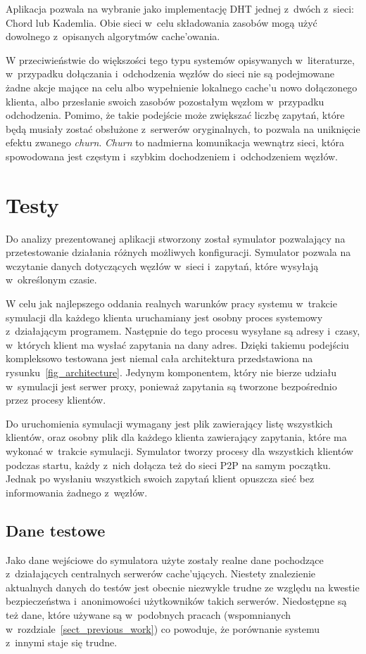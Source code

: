 \documentclass[a4paper,11pt]{scrartcl}
\newcommand{\s}{ }
\newcommand{\keszu}{cache'u}
\newcommand{\keszujacych}{cache'ujących}
\newcommand{\keszowania}{cache'owania}
\begin{document}
Aplikacja pozwala na wybranie jako implementację DHT jednej z~dwóch z~sieci: Chord lub Kademlia. Obie sieci w~celu składowania zasobów mogą użyć dowolnego z~opisanych algorytmów \keszowania.

W przeciwieństwie do większości tego typu systemów opisywanych w~literaturze, w~przypadku dołączania i~odchodzenia węzłów do sieci nie są podejmowane żadne akcje mające na celu albo wypełnienie lokalnego \keszu\s nowo dołączonego klienta, albo przesłanie swoich zasobów pozostałym węzłom w~przypadku odchodzenia. Pomimo, że takie podejście może zwiększać liczbę zapytań, które będą musiały zostać obsłużone z~serwerów oryginalnych, to pozwala na uniknięcie efektu zwanego \textit{churn}. \textit{Churn} to nadmierna komunikacja wewnątrz sieci, która spowodowana jest częstym i~szybkim dochodzeniem i~odchodzeniem węzłów.  

\section{Testy}
\label{sect_tests}
Do analizy prezentowanej aplikacji stworzony został symulator pozwalający na przetestowanie działania różnych możliwych konfiguracji. Symulator pozwala na wczytanie danych dotyczących węzłów w~sieci i~zapytań, które wysyłają w~określonym czasie. 

W celu jak najlepszego oddania realnych warunków pracy systemu w~trakcie symulacji dla każdego klienta uruchamiany jest osobny proces systemowy z~działającym programem. Następnie do tego procesu wysyłane są adresy i~czasy, w~których klient ma wysłać zapytania na dany adres. Dzięki takiemu podejściu kompleksowo testowana jest niemal cała architektura przedstawiona na rysunku~\ref{fig_architecture}. Jedynym komponentem, który nie bierze udziału w~symulacji jest serwer proxy, ponieważ zapytania są tworzone bezpośrednio przez procesy klientów.

Do uruchomienia symulacji wymagany jest plik zawierający listę wszystkich klientów, oraz osobny plik dla każdego klienta zawierający zapytania, które ma wykonać w~trakcie symulacji. Symulator tworzy procesy dla wszystkich klientów podczas startu, każdy z~nich dołącza też do sieci P2P na samym początku. Jednak po wysłaniu wszystkich swoich zapytań klient opuszcza sieć bez informowania żadnego z~węzłów.

\subsection{Dane testowe}
Jako dane wejściowe do symulatora użyte zostały realne dane pochodzące z~działających centralnych serwerów \keszujacych. Niestety znalezienie aktualnych danych do testów jest obecnie niezwykle trudne ze względu na kwestie bezpieczeństwa i~anonimowości użytkowników takich serwerów. Niedostępne są też dane, które używane są w~podobnych pracach (wspomnianych w~rozdziale~\ref{sect_previous_work}) co powoduje, że porównanie systemu z~innymi staje się trudne. 
\end{document}
